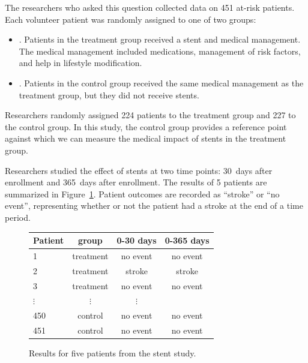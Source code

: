 The researchers who asked this question collected data on 451 at-risk patients. Each volunteer patient was randomly assigned to one of two groups:
\begin{itemize}
\item[]. Patients in the treatment group received a stent and medical management. The medical management included medications, management of risk factors, and help in lifestyle modification.
\item[]. Patients in the control group received the same medical management as the treatment group, but they did not receive stents.
\end{itemize}
Researchers randomly assigned 224 patients to the treatment group and 227 to the control group. In this study, the control group provides a reference point against which we can measure the medical impact of stents in the treatment group.

\D{\newpage}

Researchers studied the effect of stents at two time points: 30~days after enrollment and 365~days after enrollment. The results of 5 patients are summarized in Figure~\ref{stentStudyResultsDF}. Patient outcomes are recorded as ``stroke'' or ``no event'', representing whether or not the patient had a stroke at the end of a time period.

\begin{figure}[h]
\centering
\begin{tabular}{l ccc}
\hline
Patient	&	group	&	0-30 days 	&	0-365 days \\
\hline
1		&	treatment &	no event &	no event \\
2		&	treatment &	stroke & stroke \\
3		&	treatment &	no event & no event \\
$\vdots$	&	$\vdots$	  &	$\vdots$ \\
450	&	control &	no event &	no event \\
451	&	control &	no event &	no event \\
\hline
\end{tabular}
\caption{Results for five patients from the stent study.}
\label{stentStudyResultsDF}
\end{figure}

